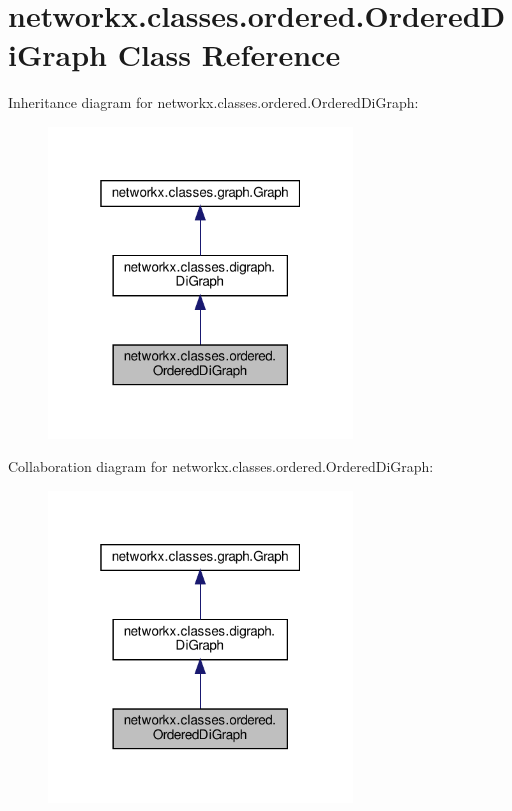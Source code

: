 \hypertarget{classnetworkx_1_1classes_1_1ordered_1_1OrderedDiGraph}{}\section{networkx.\+classes.\+ordered.\+Ordered\+Di\+Graph Class Reference}
\label{classnetworkx_1_1classes_1_1ordered_1_1OrderedDiGraph}


Inheritance diagram for networkx.\+classes.\+ordered.\+Ordered\+Di\+Graph\+:
\nopagebreak
\begin{figure}[H]
\begin{center}
\leavevmode
\includegraphics[width=229pt]{classnetworkx_1_1classes_1_1ordered_1_1OrderedDiGraph__inherit__graph}
\end{center}
\end{figure}


Collaboration diagram for networkx.\+classes.\+ordered.\+Ordered\+Di\+Graph\+:
\nopagebreak
\begin{figure}[H]
\begin{center}
\leavevmode
\includegraphics[width=229pt]{classnetworkx_1_1classes_1_1ordered_1_1OrderedDiGraph__coll__graph}
\end{center}
\end{figure}
